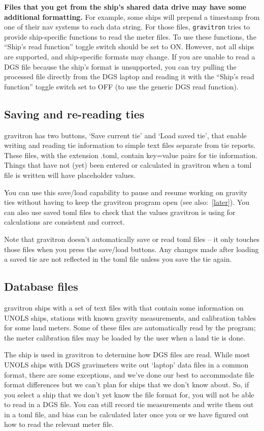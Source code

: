 \documentclass{pfpe-manual}
\begin{document}
\textbf{Files that you get from the ship's shared data drive may have some additional formatting.} For example, some ships will prepend a timestamp from one of their nav systems to each data string. For those files, \texttt{gravitron} tries to provide ship-specific functions to read the meter files. To use these functions, the ``Ship's read function'' toggle switch should be set to ON. However, not all ships are supported, and ship-specific formats may change. If you are unable to read a DGS file because the ship's format is unsupported, you can try pulling the processed file directly from the DGS laptop and reading it with the ``Ship's read function'' toggle switch set to OFF (to use the generic DGS read function).

\subsection{Saving and re-reading ties}
\label{save-re}
gravitron has two buttons, `Save current tie' and `Load saved tie', that enable writing and reading tie information to simple text files separate from tie reports. These files, with the extension .toml, contain key=value pairs for tie information. Things that have not (yet) been entered or calculated in gravitron when a toml file is written will have placeholder values.

You can use this save/load capability to pause and resume working on gravity ties without having to keep the gravitron program open (see also:~\ref{later}). You can also use saved toml files to check that the values gravitron is using for calculations are consistent and correct. 

Note that gravitron doesn't automatically save or read toml files -- it only touches those files when you press the save/load buttons. Any changes made after loading a saved tie are not reflected in the toml file unless you save the tie again.

\subsection{Database files}
\label{datab}
gravitron ships with a set of text files with that contain some information on UNOLS ships, stations with known gravity measurements, and calibration tables for some land meters. Some of these files are automatically read by the program; the meter calibration files may be loaded by the user when a land tie is done.

The ship is used in gravitron to determine how DGS files are read. While most UNOLS ships with DGS gravimeters write out `laptop' data files in a common format, there are some exceptions, and we've done our best to accommodate file format differences but we can't plan for ships that we don't know about. So, if you select a ship that we don't yet know the file format for, you will not be able to read in a DGS file. You can still record tie measurements and write them out in a toml file, and bias can be calculated later once you or we have figured out how to read the relevant meter file.
\end{document}
